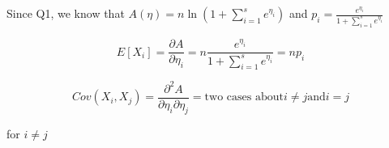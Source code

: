 \documentclass[a4paper, 12pt]{article}  %
\begin{document}
Since Q1, we know that $A(\eta)=n\ln (1+\displaystyle\sum_{i=1}^se^{\eta_i})$ and $p_i=\frac{e^{\eta_i}}{1+\sum_{i=1}^se^{\eta_i}}$

\[
E[X_i] = \frac{\partial A}{\partial \eta_i}=n\frac{e^{\eta_i}}{1+\sum_{i=1}^s e^{\eta_i}}=np_i
\]

\[
Cov(X_i, X_j)=\frac{\partial^2 A}{\partial \eta_i \partial \eta_j}= \text{two cases about}　i\not=j　\text{and}　i=j
\]

for $i \not = j$
\end{document}
